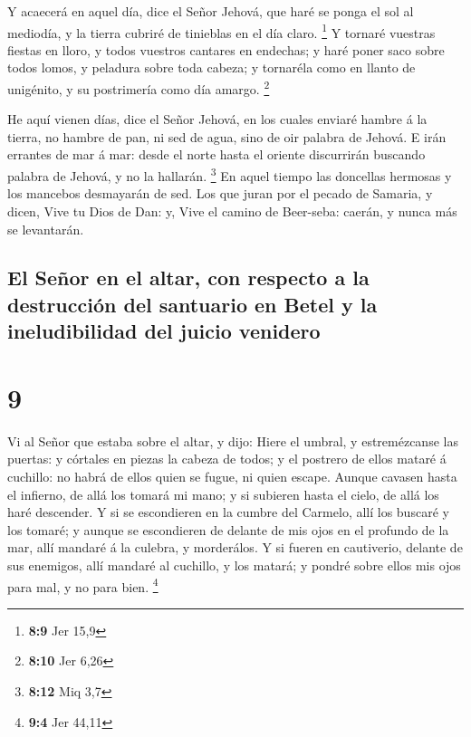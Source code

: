  Y acaecerá en aquel día, dice el Señor Jehová, que haré
se ponga el sol al mediodía, y la tierra cubriré de tinieblas en el día
claro. \footnote{\textbf{8:9} Jer 15,9}  Y tornaré
vuestras fiestas en lloro, y todos vuestros cantares en endechas; y haré
poner saco sobre todos lomos, y peladura sobre toda cabeza; y tornaréla
como en llanto de unigénito, y su postrimería como día amargo.
\footnote{\textbf{8:10} Jer 6,26}

 He aquí vienen días, dice el Señor Jehová, en los cuales
enviaré hambre á la tierra, no hambre de pan, ni sed de agua, sino de
oir palabra de Jehová.  E irán errantes de mar á mar:
desde el norte hasta el oriente discurrirán buscando palabra de Jehová,
y no la hallarán. \footnote{\textbf{8:12} Miq 3,7}  En
aquel tiempo las doncellas hermosas y los mancebos desmayarán de sed.
 Los que juran por el pecado de Samaria, y dicen, Vive tu
Dios de Dan: y, Vive el camino de Beer-seba: caerán, y nunca más se
levantarán.

\hypertarget{el-seuxf1or-en-el-altar-con-respecto-a-la-destrucciuxf3n-del-santuario-en-betel-y-la-ineludibilidad-del-juicio-venidero}{%
\subsection{El Señor en el altar, con respecto a la destrucción del
santuario en Betel y la ineludibilidad del juicio
venidero}\label{el-seuxf1or-en-el-altar-con-respecto-a-la-destrucciuxf3n-del-santuario-en-betel-y-la-ineludibilidad-del-juicio-venidero}}

\hypertarget{section-8}{%
\section{9}\label{section-8}}

 Vi al Señor que estaba sobre el altar, y dijo: Hiere el
umbral, y estremézcanse las puertas: y córtales en piezas la cabeza de
todos; y el postrero de ellos mataré á cuchillo: no habrá de ellos quien
se fugue, ni quien escape.  Aunque cavasen hasta el
infierno, de allá los tomará mi mano; y si subieren hasta el cielo, de
allá los haré descender.  Y si se escondieren en la cumbre
del Carmelo, allí los buscaré y los tomaré; y aunque se escondieren de
delante de mis ojos en el profundo de la mar, allí mandaré á la culebra,
y morderálos.  Y si fueren en cautiverio, delante de sus
enemigos, allí mandaré al cuchillo, y los matará; y pondré sobre ellos
mis ojos para mal, y no para bien. \footnote{\textbf{9:4} Jer 44,11}

